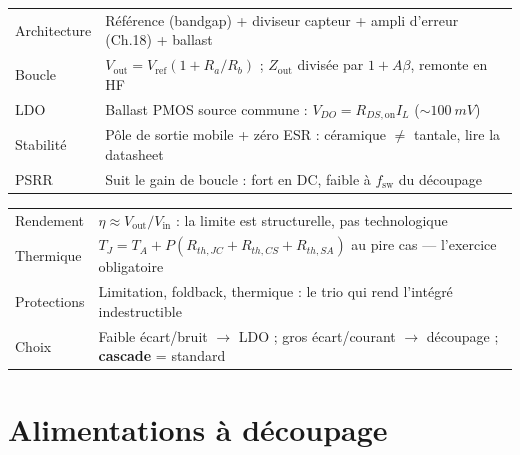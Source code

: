 \documentclass[12pt,a4paper,twoside]{book}
\begin{document}
\begin{approfondissement}[title={\color{white} Résumé --- Approfondissement}]
\begin{center}
\renewcommand{\arraystretch}{1.3}
\begin{tabular}{p{3.5cm}p{9.5cm}}
\toprule
Architecture & Référence (bandgap) + diviseur capteur + ampli d'erreur (Ch.18) + ballast \\
Boucle & $V_{\text{out}} = V_{\text{ref}}(1+R_a/R_b)$ ; $Z_{\text{out}}$ divisée par $1+A\beta$, remonte en HF \\
LDO & Ballast PMOS source commune : $V_{DO} = R_{DS,\text{on}}I_L$ ($\sim\SI{100}{mV}$) \\
Stabilité & Pôle de sortie mobile + zéro ESR : céramique $\neq$ tantale, lire la datasheet \\
PSRR & Suit le gain de boucle : fort en DC, faible à $f_{\text{sw}}$ du découpage \\
\bottomrule
\end{tabular}
\end{center}
\end{approfondissement}

\begin{ingenieur}[title={\color{white} Résumé --- Niveau Ingénieur}]
\begin{center}
\renewcommand{\arraystretch}{1.3}
\begin{tabular}{p{3.5cm}p{9.5cm}}
\toprule
Rendement & $\eta \approx V_{\text{out}}/V_{\text{in}}$ : la limite est structurelle, pas technologique \\
Thermique & $T_J = T_A + P(R_{th,JC}+R_{th,CS}+R_{th,SA})$ au pire cas --- l'exercice obligatoire \\
Protections & Limitation, foldback, thermique : le trio qui rend l'intégré indestructible \\
Choix & Faible écart/bruit $\to$ LDO ; gros écart/courant $\to$ découpage ; \textbf{cascade} = standard \\
\bottomrule
\end{tabular}
\end{center}
\end{ingenieur}


\chapter{Alimentations à découpage}
\end{document}
